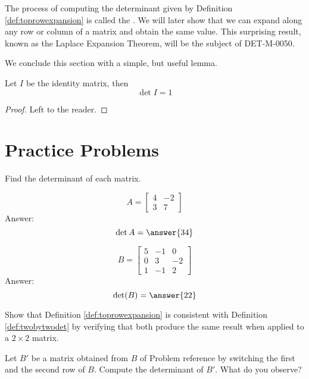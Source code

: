 \documentclass{ximera}
\begin{document}
The process of computing the determinant given by Definition \ref{def:toprowexpansion} is called the .  We will later show that we can expand along any row or column of a matrix and obtain the same value.  This surprising result, known as the Laplace Expansion Theorem, will be the subject of {\color{red} DET-M-0050}.

We conclude this section with a simple, but useful lemma.

\begin{lemma}\label{lemma:detofid} Let $I$ be the identity matrix, then
$$\det{I}=1$$
\end{lemma}
\begin{proof} Left to the reader.
\end{proof}

\section*{Practice Problems}

\begin{problem}
Find the determinant of each matrix.
  \begin{problem}
  $$A=\begin{bmatrix}4&-2\\3&7\end{bmatrix}$$
  Answer:
  $$\det{A}=\answer{34}$$
  \end{problem}
  
  \begin{problem}
  $$B=\begin{bmatrix}5&-1&0\\0&3&-2\\1&-1&2\end{bmatrix}$$
  Answer:
  $$\text{det}(B)=\answer{22}$$
  \end{problem}
\end{problem}

\begin{problem}
Show that Definition \ref{def:toprowexpansion} is consistent with Definition \ref{def:twobytwodet} by verifying that both produce the same result when applied to a $2\times 2$ matrix.
\end{problem}

\begin{problem}
Let $B'$ be a matrix obtained from $B$ of Problem {\color{red} reference} by switching the first and the second row of $B$.  Compute the determinant of $B'$.  What do you observe?
\end{problem}
\end{document}
